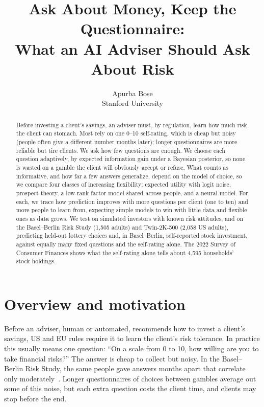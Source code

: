 \documentclass{article}
\title{Ask About Money, Keep the Questionnaire:\\What an AI Adviser Should Ask About Risk}
\author{%
  Apurba Bose \\
  Stanford University \\
}
\begin{document}
\maketitle

\begin{abstract}
Before investing a client's savings, an adviser must, by regulation, learn how much risk the client can stomach. Most rely on one 0--10 self-rating, which is cheap but noisy (people often give a different number months later); longer questionnaires are more reliable but tire clients. We ask how few questions are enough. We choose each question adaptively, by expected information gain under a Bayesian posterior, so none is wasted on a gamble the client will obviously accept or refuse. What counts as informative, and how far a few answers generalize, depend on the model of choice, so we compare four classes of increasing flexibility: expected utility with logit noise, prospect theory, a low-rank factor model shared across people, and a neural model. For each, we trace how prediction improves with more questions per client (one to ten) and more people to learn from, expecting simple models to win with little data and flexible ones as data grows. We test on simulated investors with known risk attitudes, and on the Basel--Berlin Risk Study (1,505 adults) and Twin-2K-500 (2,058 US adults), predicting held-out lottery choices and, in Basel--Berlin, self-reported stock investment, against equally many fixed questions and the self-rating alone. The 2022 Survey of Consumer Finances shows what the self-rating alone tells about 4,595 households' stock holdings.
\end{abstract}

\section{Overview and motivation}

Before an adviser, human or automated, recommends how to invest a client's savings, US and EU rules require it to learn the client's risk tolerance. In practice this usually means one question: ``On a scale from 0 to 10, how willing are you to take financial risks?'' The answer is cheap to collect but noisy. In the Basel--Berlin Risk Study, the same people gave answers months apart that correlate only moderately~\citep{frey2017}. Longer questionnaires of choices between gambles average out some of this noise, but each extra question costs the client time, and clients may stop before the end.
\end{document}
